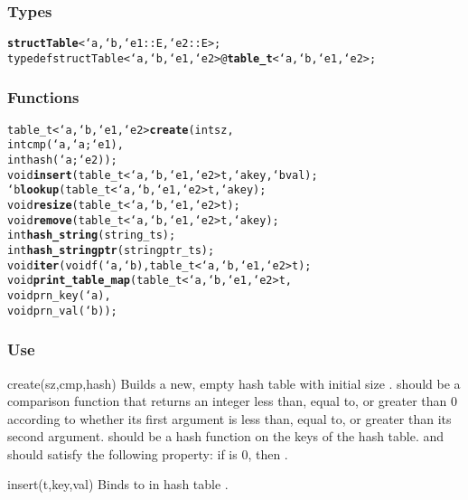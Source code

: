 \subsubsection*{Types}
\begin{alltt}
\textbf{struct Table}<`a,`b,`e1::E,`e2::E>;
typedef struct Table<`a,`b,`e1,`e2> @\textbf{table_t}<`a,`b,`e1,`e2>;
\end{alltt}

\subsubsection*{Functions}

\begin{alltt}
table_t<`a,`b,`e1,`e2> \textbf{create}(int sz,
                              int cmp(`a,`a;`e1),
                              int hash(`a;`e2));
void                   \textbf{insert}(table_t<`a,`b,`e1,`e2> t, `a key, `b val);
`b                     \textbf{lookup}(table_t<`a,`b,`e1,`e2> t, `a key);
void                   \textbf{resize}(table_t<`a,`b,`e1,`e2> t);
void                   \textbf{remove}(table_t<`a,`b,`e1,`e2> t, `a key);
int                    \textbf{hash_string}(string_t s);
int                    \textbf{hash_stringptr}(stringptr_t s);
void                   \textbf{iter}(void f(`a,`b), table_t<`a,`b,`e1,`e2> t);
void                   \textbf{print_table_map}(table_t<`a,`b,`e1,`e2> t,
                                       void prn_key(`a),
                                       void prn_val(`b));
\end{alltt}

\subsubsection*{Use}

\begin{defun}{create}{(sz,cmp,hash)}
Builds a new, empty hash table with initial size .  
should be a comparison function that returns an integer less than, equal
to, or greater than 0 according to whether its first argument is less
than, equal to, or greater than its second argument.   should
be a hash function on the keys of the hash table.   and
 should satisfy the following property: if
 is 0, then .
\end{defun}

\begin{defun}{insert}{(t,key,val)}
Binds  to  in hash table .
\end{defun}

